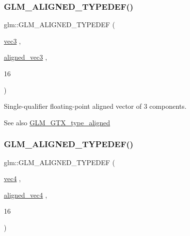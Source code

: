 \subsubsection{\texorpdfstring{G\+L\+M\+\_\+\+A\+L\+I\+G\+N\+E\+D\+\_\+\+T\+Y\+P\+E\+D\+E\+F()}{GLM\_ALIGNED\_TYPEDEF()}\hspace{0.1cm}{\footnotesize\ttfamily [145/209]}}
{\footnotesize\ttfamily glm\+::\+G\+L\+M\+\_\+\+A\+L\+I\+G\+N\+E\+D\+\_\+\+T\+Y\+P\+E\+D\+EF (\begin{DoxyParamCaption}\item[{\hyperlink{group__core__types_ga1c47e8b3386109bc992b6c48e91b0be7}{vec3}}]{,  }\item[{\hyperlink{group__gtc__type__aligned_ga9c54536a3becfd10a44f6b1b8c4aa3d3}{aligned\+\_\+vec3}}]{,  }\item[{16}]{ }\end{DoxyParamCaption})}

Single-\/qualifier floating-\/point aligned vector of 3 components. \begin{DoxySeeAlso}{See also}
\hyperlink{group__gtx__type__aligned}{G\+L\+M\+\_\+\+G\+T\+X\+\_\+type\+\_\+aligned} 
\end{DoxySeeAlso}
\mbox{\label{group__gtx__type__aligned_ga12fe7b9769c964c5b48dcfd8b7f40198}} 
\subsubsection{\texorpdfstring{G\+L\+M\+\_\+\+A\+L\+I\+G\+N\+E\+D\+\_\+\+T\+Y\+P\+E\+D\+E\+F()}{GLM\_ALIGNED\_TYPEDEF()}\hspace{0.1cm}{\footnotesize\ttfamily [146/209]}}
{\footnotesize\ttfamily glm\+::\+G\+L\+M\+\_\+\+A\+L\+I\+G\+N\+E\+D\+\_\+\+T\+Y\+P\+E\+D\+EF (\begin{DoxyParamCaption}\item[{\hyperlink{group__core__types_ga5881b1b022d7fd1b7218f5916532dd02}{vec4}}]{,  }\item[{\hyperlink{group__gtc__type__aligned_gad26d520694d7b865507819c2d9f2b196}{aligned\+\_\+vec4}}]{,  }\item[{16}]{ }\end{DoxyParamCaption})}

